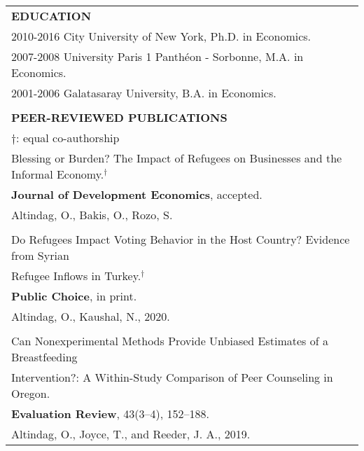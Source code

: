 \documentclass[12 pt]{article}
\begin{document}
\begin{longtable}{ccccc}
\\


\multicolumn{5}{l}{\textbf{EDUCATION}}\\[2 pt]
  \multicolumn{4}{l}{2010\phantom{7}-\phantom{8}2016 \phantom{0000}City University of New York, Ph.D. in Economics.}     \\
    \multicolumn{4}{l}{2007\phantom{1}-\phantom{6}2008 \phantom{000..}University Paris 1 Panth\'{e}on - Sorbonne, M.A. in Economics.} \\
\multicolumn{4}{l}{2001\phantom{1}-\phantom{0}2006 \phantom{000.} Galatasaray University,  B.A. in Economics.}  \\
\\

\multicolumn{5}{l}{\textbf{PEER-REVIEWED PUBLICATIONS }} \\ 
 \multicolumn{5}{l}{\footnotesize{$\dagger$: equal co-authorship}} \\[4 pt]

  \multicolumn{5}{l}{Blessing or Burden? The Impact of Refugees on Businesses and the Informal Economy.$^{\dagger}$} \\
     \multicolumn{5}{l}{\textbf{Journal of Development Economics}, accepted.} \\  
  \multicolumn{5}{l}{Altindag, O., Bakis, O., Rozo, S.} \\

\\


   \multicolumn{5}{l}{Do Refugees Impact Voting Behavior in the Host Country? Evidence from Syrian} \\
    \multicolumn{5}{l}{Refugee Inflows in Turkey.$^{\dagger}$} \\
     \multicolumn{5}{l}{\textbf{Public Choice}, in print.} \\  
 \multicolumn{5}{l}{Altindag, O., Kaushal, N., 2020.} \\
\\

   \multicolumn{5}{l}{Can Nonexperimental Methods Provide Unbiased Estimates of a Breastfeeding} \\
  \multicolumn{5}{l}{Intervention?: A Within-Study Comparison of Peer Counseling in Oregon. } \\
    \multicolumn{5}{l}{\textbf{Evaluation Review}, 43(3–4), 152–188.} \\
 \multicolumn{5}{l}{Altindag, O., Joyce, T., and Reeder, J. A., 2019.} \\




\end{longtable}
\end{document}
